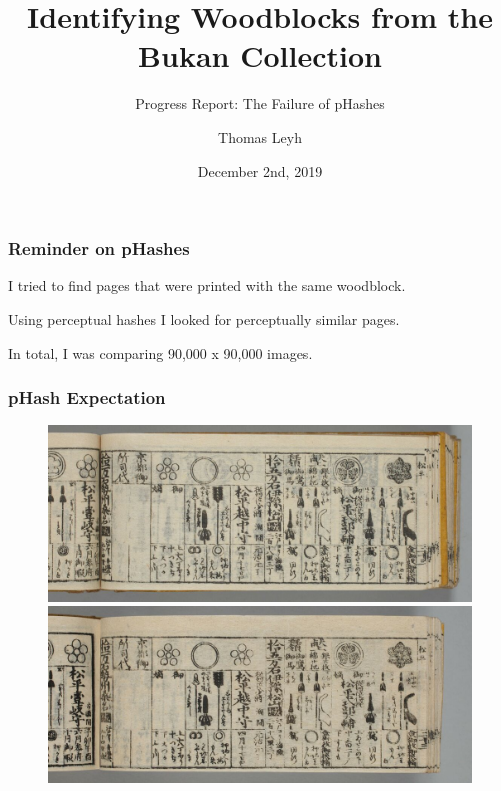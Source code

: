 \documentclass{beamer}
\title[Identifying Woodblocks]{Identifying Woodblocks from the Bukan Collection}
\subtitle{Progress Report: The Failure of pHashes}
\author{Thomas Leyh}
\institute[]{University of Freiburg, Germany}
\date{December 2nd, 2019}
\begin{document}
  \begin{frame}
    \titlepage
  \end{frame}

  \begin{frame}
    \frametitle{Reminder on pHashes}
    I tried to find pages that were printed with the same woodblock.

    \bigskip
    Using \alert{perceptual hashes} I looked for perceptually similar pages.

    \bigskip
    In total, I was comparing 90,000 x 90,000 images.
  \end{frame}

  \begin{frame}
    \frametitle{pHash Expectation}
    \begin{figure}
      \centering
      \includegraphics{200019552_00050}
      \includegraphics{200019556_00050}
    \end{figure}
  \end{frame}
  
\end{document}
